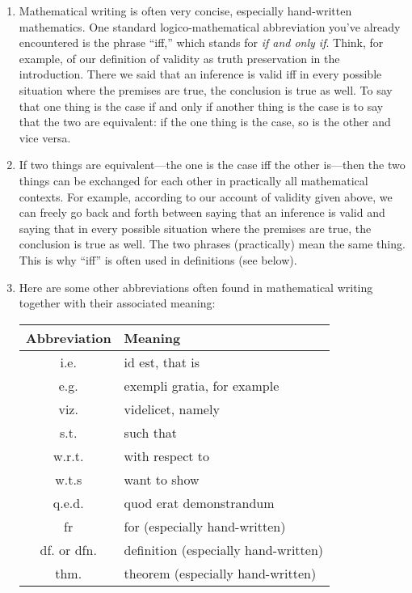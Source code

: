 \begin{enumerate}[{\thesection}.1]
		\item Mathematical writing is often very concise, especially hand-written mathematics. One standard logico-mathematical abbreviation you've already encountered is the phrase ``iff,'' which stands for \emph{if and only if}. Think, for example, of our definition of validity as truth preservation in the introduction. There we said that an inference is valid iff in every possible situation where the premises are true, the conclusion is true as well. To say that one thing is the case if and only if another thing is the case is to say that the two are equivalent: if the one thing is the case, so is the other and vice versa. 

	\item If two things are equivalent---the one is the case iff the other is---then the two things can be exchanged for each other in practically all mathematical contexts. For example, according to our account of validity given above, we can freely go back and forth between saying that an inference is valid and saying that in every possible situation where the premises are true, the conclusion is true as well. The two phrases (practically) mean the same thing. This is why ``iff'' is often used in definitions (see below). 
	
	\item Here are some other abbreviations often found in mathematical writing together with their associated meaning:
	
		\begin{longtable}{c | l}
			Abbreviation & Meaning\\\hline
			
			i.e. & id est, that is\\
			e.g. & exempli gratia, for example\\
			viz. & videlicet, namely\\
			s.t. & such that\\
			w.r.t. & with respect to\\
			w.t.s & want to show\\
			q.e.d. & quod erat demonstrandum\\
			fr & for (especially hand-written)\\
			df. or dfn. & definition (especially hand-written)\\
			thm. & theorem (especially hand-written)\\
			
			\end{longtable}
				

\end{enumerate}
